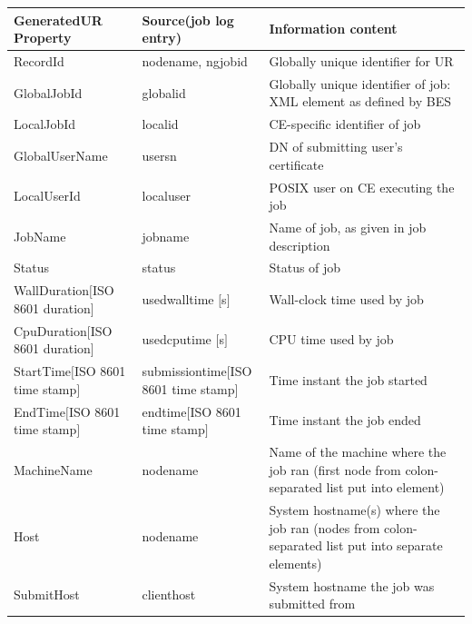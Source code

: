 \documentclass{article}                            %
\begin{document}
\begin{tabular}{|p{}|p{}|p{}|}
\hline
\textbf{Generated\newline UR Property}&
\textbf{Source\newline(job log entry)}&
\textbf{Information content}\\
\hline\hline
RecordId&
nodename,\newline
ngjobid&
Globally unique identifier for UR\\
\hline
GlobalJobId&
globalid&
Globally unique identifier of job:\newline
XML element as defined by BES\\
\hline
LocalJobId&
localid&
CE-specific identifier of job\\
\hline
GlobalUserName&
usersn&
DN of submitting user's certificate\\
\hline
LocalUserId&
localuser&
POSIX user on CE executing the job\\
\hline
JobName&
jobname&
Name of job, as given in job description\\
\hline
Status&
status&
Status of job\\
\hline
WallDuration\newline $[$ISO 8601 duration$]$&
usedwalltime $[$s$]$&
Wall-clock time used by job\\
\hline
CpuDuration\newline $[$ISO 8601 duration$]$&
usedcputime $[$s$]$&
CPU time used by job\\
\hline
StartTime\newline $[$ISO 8601 time stamp$]$&
submissiontime\newline $[$ISO 8601 time stamp$]$&
Time instant the job started\\
\hline
EndTime\newline $[$ISO 8601 time stamp$]$&
endtime\newline $[$ISO 8601 time stamp$]$&
Time instant the job ended\\
\hline
MachineName&
nodename&
Name of the machine where the job ran\newline
(first node from colon-separated list put into element)\\
\hline
Host&
nodename&
System hostname(s) where the job ran\newline
(nodes from colon-separated list put into separate elements)\\
\hline
SubmitHost&
clienthost&
System hostname the job was submitted from\\

\end{tabular}
\end{document}
